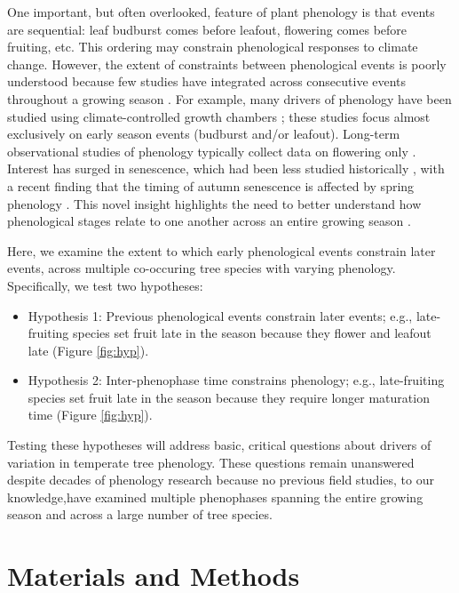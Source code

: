 \documentclass{article}
\begin{document}
\par One important, but often overlooked, feature of plant phenology is that events are sequential: leaf budburst comes before leafout, flowering comes before fruiting, etc. This ordering may constrain phenological responses to climate change. However, the extent of constraints between phenological events is poorly understood because few studies have integrated across consecutive events throughout a growing season \citep{wolkovich2014}. For example, many drivers of phenology have been studied using climate-controlled growth chambers \citep[e.g.,][]{basler2012, laube2014}; these studies focus almost exclusively on early season events (budburst and/or leafout).  Long-term observational studies of phenology typically collect data on flowering only  \citep [e.g. 64\% of studies in ][]{wolkovich2012nectar}. Interest has surged in senescence, which had been less studied historically \citep {parmesan2006}, with a recent finding that the timing of autumn senescence is affected by spring phenology \citep {keenan2015}. This novel insight highlights the need to better understand how phenological stages relate to one another across an entire growing season \citep{wolkovich2014}. 

\par Here, we examine the extent to which early phenological events constrain later events, across multiple co-occuring tree species with varying phenology. Specifically, we test two hypotheses:
\begin{itemize}
\item Hypothesis 1: Previous phenological events constrain later events; e.g., late-fruiting species set fruit late in the season because they flower and leafout late  (Figure \ref{fig:hyp}).
\item Hypothesis 2: Inter-phenophase time  constrains phenology; e.g., late-fruiting species set fruit late in the season because they require longer maturation time (Figure \ref{fig:hyp}).
\end{itemize}
Testing these hypotheses will address basic, critical questions about drivers of variation in temperate tree phenology. These questions remain unanswered despite decades of phenology research because no previous field studies, to our knowledge,have examined multiple phenophases spanning the entire growing season and across a large number of tree species. 
\section* {Materials and Methods}
\end{document}
